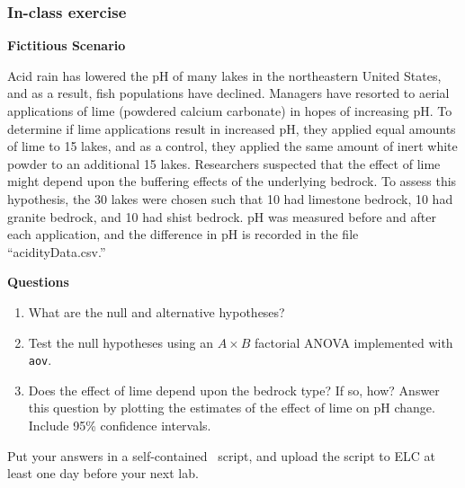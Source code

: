 \documentclass[color=usenames,dvipsnames]{beamer}\usepackage[]{graphicx}\usepackage[]{color}
\newcommand{\inr}[1]{\colorbox{inlinecolor}{\texttt{#1}}}
\begin{document}
\begin{frame}
  \frametitle{In-class exercise}
\scriptsize %

{\bf Fictitious Scenario \par}
Acid rain has lowered the pH of many
lakes in the northeastern United States, and as a result, fish
populations have declined. Managers have resorted to aerial
applications of lime (powdered calcium carbonate) in hopes of
increasing pH. To determine if lime applications result in increased
pH, they applied equal amounts of lime to 15 lakes, and as a control,
they applied the same amount of inert white powder to an additional 15
lakes. Researchers suspected that the effect of lime might depend upon
the buffering effects of the underlying bedrock. To assess this
hypothesis, the 30 lakes were chosen such that 10 had limestone
bedrock, 10 had granite bedrock, and 10 had shist bedrock. pH was
measured before and after each application, and the difference in pH
is recorded in the file ``acidityData.csv.'' \par
\pause
\vfill
{\bf Questions}
\begin{enumerate}[{\bf 1}]
  \item What are the null and alternative hypotheses?
  \item Test the null hypotheses using an $A \times B$ factorial ANOVA
    implemented with \inr{aov}. %
  \item Does the effect of lime depend upon the bedrock type? If so,
    how? Answer this question by plotting the estimates of the effect of lime on
    pH change. Include 95\% confidence intervals.
\end{enumerate}
\pause
\vfill
Put your answers in a self-contained \R~script, and upload the script
to ELC at least one day before your next lab.
\end{frame}
\end{document}
